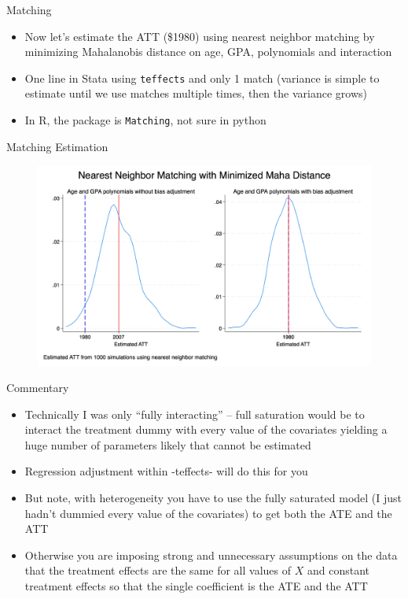 \documentclass{beamer}
\begin{document}
\begin{frame}{Matching}

\begin{itemize}

\item Now let's estimate the ATT (\$1980) using nearest neighbor matching by minimizing Mahalanobis distance on age, GPA, polynomials and interaction
\item One line in Stata using \texttt{teffects} and only 1 match (variance is simple to estimate until we use matches multiple times, then the variance grows)
\item In R, the package is \texttt{Matching}, not sure in python
\end{itemize}

\end{frame}


\begin{frame}{Matching Estimation}

\begin{figure}[!t]\centering
\includegraphics[scale=0.1]{./lecture_includes/combined_kernels_maha.jpg}
\end{figure}

\end{frame}

\begin{frame}{Commentary}

\begin{itemize}

\item Technically I was only ``fully interacting'' -- full saturation would be to interact the treatment dummy with every value of the covariates yielding a huge number of parameters likely that cannot be estimated
\item Regression adjustment within -teffects- will do this for you
\item But note, with heterogeneity you have to use the fully saturated model (I just hadn't dummied every value of the covariates) to get both the ATE and the ATT
\item Otherwise you are imposing strong and unnecessary assumptions on the data that the treatment effects are the same for all values of $X$ and constant treatment effects so that the single coefficient is the ATE and the ATT

\end{itemize}

\end{frame}
\end{document}
